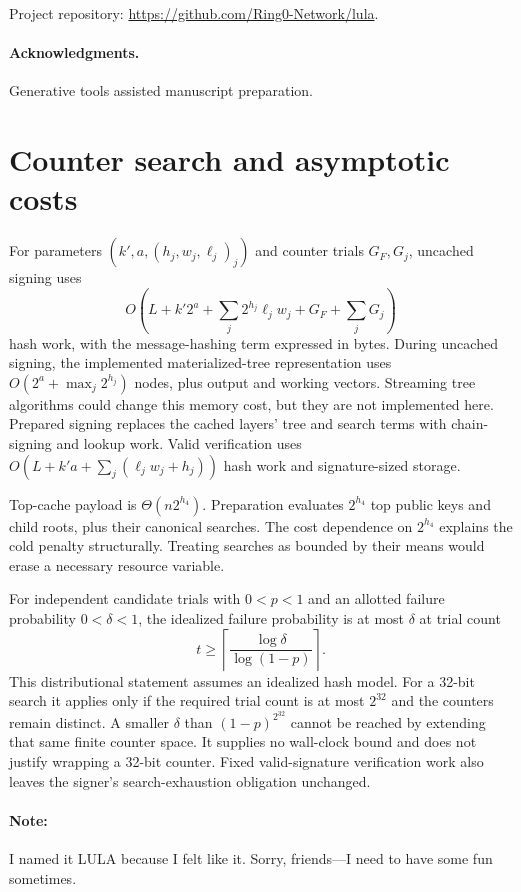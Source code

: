 \documentclass[a4paper,envcountsame,runningheads]{llncs}
\begin{document}
Project repository: \url{https://github.com/Ring0-Network/lula}.

\paragraph{Acknowledgments.}
Generative tools assisted manuscript preparation.



\appendix
\section{Counter search and asymptotic costs}\label{app:search}
For parameters $(k',a,(h_j,w_j,\ell_j)_j)$ and counter trials $G_F,G_j$, uncached signing uses
\[
 O\!\left(L+k'2^a+\sum_j 2^{h_j}\ell_jw_j+G_F+\sum_jG_j\right)
\]
hash work, with the message-hashing term expressed in bytes. During uncached signing, the implemented materialized-tree representation uses $O(2^a+\max_j2^{h_j})$ nodes, plus output and working vectors. Streaming tree algorithms could change this memory cost, but they are not implemented here. Prepared signing replaces the cached layers' tree and search terms with chain-signing and lookup work. Valid verification uses $O(L+k'a+\sum_j(\ell_jw_j+h_j))$ hash work and signature-sized storage.

Top-cache payload is $\Theta(n2^{h_4})$. Preparation evaluates $2^{h_4}$ top public keys and child roots, plus their canonical searches. The cost dependence on $2^{h_4}$ explains the cold penalty structurally. Treating searches as bounded by their means would erase a necessary resource variable.

For independent candidate trials with $0<p<1$ and an allotted failure probability $0<\delta<1$, the idealized failure probability is at most $\delta$ at trial count
\[
 t\ge\left\lceil\frac{\log\delta}{\log(1-p)}\right\rceil.
\]
This distributional statement assumes an idealized hash model. For a 32-bit search it applies only if the required trial count is at most $2^{32}$ and the counters remain distinct. A smaller $\delta$ than $(1-p)^{2^{32}}$ cannot be reached by extending that same finite counter space. It supplies no wall-clock bound and does not justify wrapping a 32-bit counter. Fixed valid-signature verification work also leaves the signer's search-exhaustion obligation unchanged.

\FloatBarrier
\paragraph{Note:}
I named it LULA because I felt like it. Sorry, friends---I need to have some fun sometimes.
\end{document}
